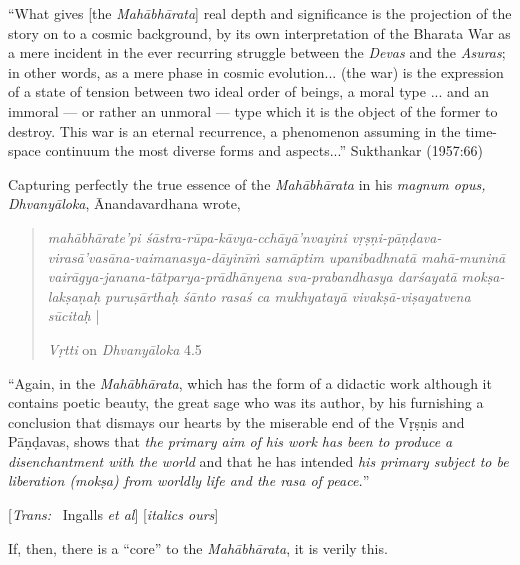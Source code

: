 \begin{myquote}
“What gives [the {\sl Mahābhārata}] real depth and significance is the projection of the story on to a cosmic background, by its own interpretation of the Bharata War as a mere incident in the ever recurring struggle between the {\sl Devas} and the {\sl Asuras}; in other words, as a mere phase in cosmic evolution... (the war) is the expression of a state of tension between two ideal order of beings, a moral type ...  and an immoral --- or rather an unmoral --- type which it is the object of the former to destroy. This war is an eternal recurrence, a phenomenon assuming in the time-space continuum the most diverse forms and aspects...” 
\hfill Sukthankar (1957:66)
\end{myquote}

Capturing perfectly the true essence of the {\sl Mahābhārata} in his {\sl magnum opus, Dhvanyāloka}, Ānandavardhana wrote, 

\begin{quote}
{{\sl mahābhārate'pi śāstra-rūpa-kāvya-cchāyā’nvayini vṛṣṇi-pāṇḍava-virasā’vasāna-vaimanasya-dāyinīṁ samāptim upanibadhnatā mahā-muninā vairāgya-janana-tātparya-prādhānyena sva-\break prabandhasya darśayatā mokṣa-lakṣaṇaḥ puruṣārthaḥ śānto rasaś ca mukhyatayā vivakṣā-viṣayatvena sūcitaḥ}} |\relax

\hfill {\sl Vṛtti} on {\sl Dhvanyāloka} 4.5
\end{quote}

\begin{myquote}
“Again, in the {\sl Mahābhārata}, which has the form of a didactic work although it contains poetic beauty, the great sage who was its author, by his furnishing a conclusion that dismays our hearts by the miserable end of the Vṛṣṇis and Pāṇḍavas, shows that {\sl the primary aim of his work has been to produce a disenchantment with the world} and that he has intended {\sl his primary subject to be liberation (mokṣa) from worldly life and the rasa of peace.}”

\hfill [{\sl Trans:}~ Ingalls {\sl et al}] [{\sl italics ours}]
\end{myquote}

\newpage

If, then, there is a “core” to the {\sl Mahābhārata}, it is verily this.  

